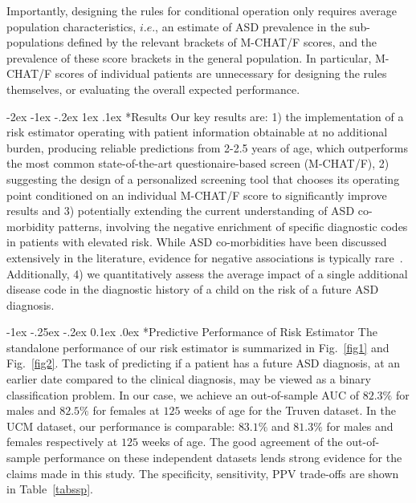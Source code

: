 \documentclass[onecolumn,,10pt]{IEEEtran}
\makeatletter
\renewcommand\section{\@startsection {section}{1}{\z@}%
  {-2ex \@plus -1ex \@minus -.2ex}%
  {1ex \@plus.1ex}%
  {\Large\bfseries\scshape}}
\renewcommand\subsection{\@startsection {section}{1}{\z@}%
  {-1ex \@plus -.25ex \@minus -.2ex}%
  {0.1ex \@plus.0ex}%
  {\fontsize{11}{12}\selectfont\bfseries\sffamily\color{DodgerBlue4}}}
\makeatother
\begin{document}
Importantly, designing the rules for  conditional  operation  only requires average population characteristics, $i.e.$, an  estimate of ASD prevalence in the sub-populations defined by the  relevant brackets of M-CHAT/F scores, and the prevalence of these score brackets in the general population. In particular,   M-CHAT/F scores of individual patients are unnecessary for designing the rules themselves, or evaluating the overall expected performance. 
%


\section*{Results}
Our key  results are: 1) the implementation of a risk estimator  operating with patient information obtainable at no additional burden, producing reliable predictions from 2-2.5 years of age, which outperforms the most common  state-of-the-art questionaire-based screen (M-CHAT/F), 2) suggesting the design of  a personalized screening tool that chooses its operating point conditioned on an individual M-CHAT/F score to significantly improve results and 3) potentially  extending the current understanding of ASD co-morbidity patterns, involving the  negative enrichment of specific  diagnostic codes in patients  with elevated risk. While ASD co-morbidities have been discussed extensively in the literature, evidence for  negative associations is typically rare~\cite{pmid25681541}. Additionally, 4) we  quantitatively assess the average impact of a single additional disease code in the diagnostic history of a child on the risk of a future ASD diagnosis.

\subsection*{Predictive Performance of Risk Estimator}
The standalone performance of our risk estimator is summarized  in Fig.~\ref{fig1} and Fig.~\ref{fig2}. The task of predicting if a patient has a future ASD diagnosis, at an earlier date compared to the clinical diagnosis,  may be viewed as a binary classification problem.
In our case, we achieve an out-of-sample AUC of $82.3\%$ for males and $82.5\%$ for females at $125$ weeks of age for the Truven dataset. In the UCM dataset, our performance is comparable: $83.1\%$ and $81.3\%$ for males and females respectively at $125$ weeks of age. The good agreement of the out-of-sample performance on these independent datasets lends strong evidence for the claims made in this study.
The specificity, sensitivity, PPV trade-offs are shown in Table~\ref{tabssp}.
\end{document}
